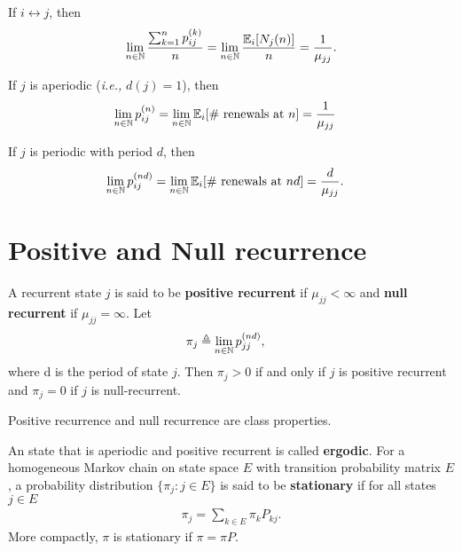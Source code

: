 \documentclass[a4paper,10pt,english]{article}
\begin{document}
\begin{prop} 
If $i \leftrightarrow j$, then 
\begin{align*}
\lim_{n \in \mathbb{N}} \frac{\sum_{k=1}^n p_{ij}^{(k)}}{n} = \lim_{n \in \mathbb{N}} \frac{\mathbb{E}_i[N_j(n)] }{n} = \frac{1}{\mu_{jj}}.\end{align*}
\end{prop}

\begin{prop}
 If $j$ is aperiodic (\textit{i.e.,} $d(j)=1$), then 
 \begin{align*} \lim_{n \in \mathbb{N}} p_{ij}^{(n)} &= \lim_{n \in \mathbb{N}} \mathbb{E}_i[\# \text{ renewals at $n$}]  = \frac{1}{\mu_{jj}}
 \end{align*}
	\item If $j$ is periodic with period $d$, then 
\begin{align*} 
\lim_{n \in \mathbb{N}} p_{ij}^{(nd)} &= \lim_{n \in \mathbb{N}} \mathbb{E}_i[\# \text{ renewals at $nd$}] = \frac{d}{\mu_{jj}}.
\end{align*}
\end{prop}

\section{Positive and Null recurrence}
A recurrent state $j$ is said to be \textbf{positive recurrent} if $\mu_{jj} < \infty$ and \textbf{null recurrent} if $\mu_{jj} = \infty$. 
Let
\begin{align*}
\pi_j &\triangleq \lim_{n \in \mathbb{N}} p_{jj}^{(nd)},
\end{align*}
where d is the period of state $j$. Then $\pi_j > 0$ if and only if $j$ is positive recurrent and $\pi_j = 0$ if  $j$ is null-recurrent. 

\begin{prop}
Positive recurrence and null recurrence are class properties.
\end{prop}
An state that is aperiodic and positive recurrent is called \textbf{ergodic}.
For a homogeneous Markov chain on state space $E$ with transition probability matrix $E$, a probability distribution $\{\pi_j: j \in E\}$ is said to be \textbf{stationary} if for all states $j \in E$
\begin{align*}
\pi_j = \sum_{k \in E} \pi_k P_{kj}.
\end{align*}
More compactly, $\pi$ is stationary if $\pi = \pi P$. %
\end{document}
